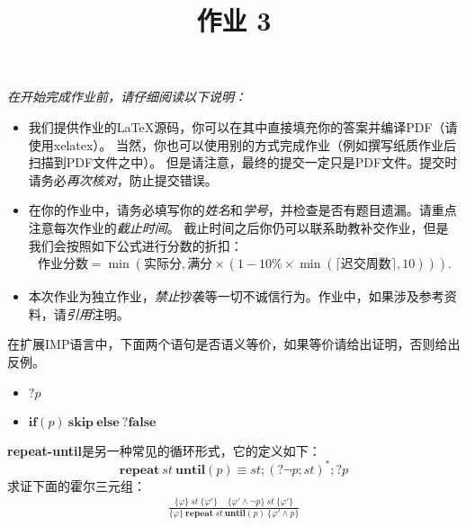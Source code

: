 \documentclass[11pt,a4paper]{article}
\title{作业 3}
\begin{document}
\maketitle

\textit{在开始完成作业前，请仔细阅读以下说明：}
\begin{itemize}
    \item 我们提供作业的\LaTeX 源码，你可以在其中直接填充你的答案并编译PDF（请使用xelatex）。
    当然，你也可以使用别的方式完成作业（例如撰写纸质作业后扫描到PDF文件之中）。
    但是请注意，最终的提交一定只是PDF文件。提交时请务必\emph{再次核对}，防止提交错误。
    \item 在你的作业中，请务必填写你的\emph{姓名}和\emph{学号}，并检查是否有题目遗漏。请重点注意每次作业的\emph{截止时间}。
    截止时间之后你仍可以联系助教补交作业，但是我们会按照如下公式进行分数的折扣：
    \begin{align*}
        \text{作业分数} = \min\left(\text{实际分}, \text{满分}\times\left(1 - 10\%\times\min\left(\lceil\text{迟交周数}\rceil, 10\right)\right)\right).
    \end{align*}
    \item 本次作业为独立作业，\emph{禁止}抄袭等一切不诚信行为。作业中，如果涉及参考资料，请\emph{引用}注明。
\end{itemize}



\subproblem 在扩展IMP语言中，下面两个语句是否语义等价，如果等价请给出证明，否则给出反例。
\begin{itemize}
    \item $?p$
    \item $\textbf{if}(p)\ \textbf{skip}\ \textbf{else}\ ?\textbf{false}$
\end{itemize}
\begin{solution}
\end{solution}


\subproblem \textbf{repeat-until}是另一种常见的循环形式，它的定义如下：
$$\textbf{repeat}\ st\ \textbf{until}(p)\equiv st;(?\neg p;st)^*;?p$$
求证下面的霍尔三元组：
\begin{align*}
    \frac{
        \{\varphi\}\ st\ \{\varphi'\} \;\;\;\;
        \{\varphi'\wedge\neg p\}\ st\ \{\varphi'\}
    }{\{\varphi\}\ \textbf{repeat}\ st\ \textbf{until}(p)\ \{\varphi'\wedge p\}}
\end{align*}
\begin{solution}
\end{solution}
\end{document}
